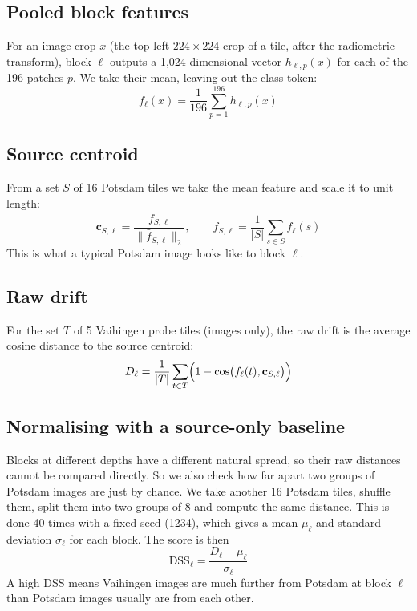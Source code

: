 \documentclass[11pt,a4paper]{report}
\begin{document}
\subsection{Pooled block features}

For an image crop $x$ (the top-left $224 \times 224$ crop of a tile, after the radiometric transform), block $\ell$ outputs a 1,024-dimensional vector $h_{\ell,p}(x)$ for each of the 196 patches $p$. We take their mean, leaving out the class token:
\begin{equation}
    f_\ell(x) = \frac{1}{196} \sum_{p=1}^{196} h_{\ell,p}(x)
\end{equation}

\subsection{Source centroid}

From a set $S$ of 16 Potsdam tiles we take the mean feature and scale it to unit length:
\begin{equation}
    \mathbf{c}_{S,\ell} = \frac{\bar f_{S,\ell}}{\lVert \bar f_{S,\ell} \rVert_2}, \qquad \bar f_{S,\ell} = \frac{1}{|S|}\sum_{s \in S} f_\ell(s)
\end{equation}
This is what a typical Potsdam image looks like to block $\ell$.

\subsection{Raw drift}

For the set $T$ of 5 Vaihingen probe tiles (images only), the raw drift is the average cosine distance to the source centroid:
\begin{equation}
    D_\ell = \frac{1}{|T|} \sum_{t \in T} \Bigl(1 - \cos\bigl(f_\ell(t), \mathbf{c}_{S,\ell}\bigr)\Bigr)
\end{equation}

\subsection{Normalising with a source-only baseline}

Blocks at different depths have a different natural spread, so their raw distances cannot be compared directly. So we also check how far apart two groups of Potsdam images are just by chance. We take another 16 Potsdam tiles, shuffle them, split them into two groups of 8 and compute the same distance. This is done 40 times with a fixed seed (1234), which gives a mean $\mu_\ell$ and standard deviation $\sigma_\ell$ for each block. The score is then
\begin{equation}
    \text{DSS}_\ell = \frac{D_\ell - \mu_\ell}{\sigma_\ell}
\end{equation}
A high DSS means Vaihingen images are much further from Potsdam at block $\ell$ than Potsdam images usually are from each other.
\end{document}

